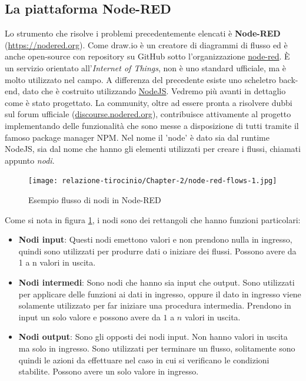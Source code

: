 \documentclass[a4paper,10pt]{memoir}
\begin{document}
\subsection{La piattaforma Node-RED}
Lo strumento che risolve i problemi precedentemente elencati è \textbf{Node-RED} (\href{https://nodered.org}{https://nodered.org}).
Come draw.io è un creatore di diagrammi di flusso ed è anche open-source con repository su GitHub sotto l'organizzazione \href{https://github.com/node-red}{node-red}. È un servizio orientato all'\textit{Internet of Things}, non è uno standard ufficiale, ma è molto utilizzato nel campo.
A differenza del precedente esiste uno scheletro back-end, dato che è costruito utilizzando \href{https://nodejs.org}{NodeJS}. Vedremo più avanti in dettaglio come è stato progettato.
La community, oltre ad essere pronta a risolvere dubbi sul forum ufficiale (\href{https://discourse.nodered.org}{discourse.nodered.org}), contribuisce attivamente al progetto implementando delle funzionalità che sono messe a disposizione di tutti tramite il famoso package manager NPM.
Nel nome il 'node' è dato sia dal runtime NodeJS, sia dal nome che hanno gli elementi utilizzati per creare i flussi, chiamati appunto \textit{nodi}.
\begin{figure}[H]
\caption{Esempio flusso di nodi in Node-RED}
\label{fig:node-red-flows-example1}
\texttt{[image: relazione-tirocinio/Chapter-2/node-red-flows-1.jpg]}
\end{figure}
Come si nota in figura \ref{fig:node-red-flows-example1}, i nodi sono dei rettangoli che hanno funzioni particolari:
\begin{itemize}
    \item \textbf{Nodi input}: Questi nodi emettono valori e non prendono nulla in ingresso, quindi sono utilizzati per produrre dati o iniziare dei flussi. Possono avere da 1 a n valori in uscita.
    \item \textbf{Nodi intermedi}: Sono nodi che hanno sia input che output. Sono utilizzati per applicare delle funzioni ai dati in ingresso, oppure il dato in ingresso viene solamente utilizzato per far iniziare una procedura intermedia. Prendono in input un solo valore e possono avere da $1$ a $n$ valori in uscita.
    \item \textbf{Nodi output}: Sono gli opposti dei nodi input. Non hanno valori in uscita ma solo in ingresso. Sono utilizzati per terminare un flusso, solitamente sono quindi le azioni da effettuare nel caso in cui si verificano le condizioni stabilite. Possono avere un solo valore in ingresso.
\end{itemize}
\end{document}
